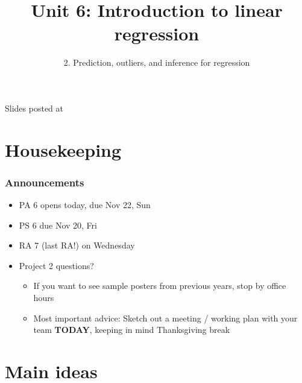 \documentclass[slidestop,compress,mathserif,12pt,t,professionalfonts,xcolor=table]{beamer}
\title{Unit 6: Introduction to linear regression}
\subtitle{2. Prediction, outliers, and inference for regression}
\author{\CourseName}
\date{}
\institute{\InstituteName}
\begin{document}



\begin{frame}[plain]

\titlepage

\vfill

{\scriptsize {} \hfill Slides posted at  \webURL{\CourseSite}}

\addtocounter{framenumber}{-1} 

\end{frame}


\section{Housekeeping}


\begin{frame}
\frametitle{Announcements}

\begin{itemize}

\item PA 6 opens today, due Nov 22, Sun

\item PS 6 due Nov 20, Fri

\item RA 7 (last RA!) on Wednesday

\item Project 2 questions?
\begin{itemize}
\item If you want to see sample posters from previous years, stop by office hours
\item Most important advice: Sketch out a meeting / working plan with your team \textbf{TODAY}, keeping in mind
Thanksgiving break
\end{itemize}

\end{itemize}

\end{frame}


\section{Main ideas}
\end{document}
